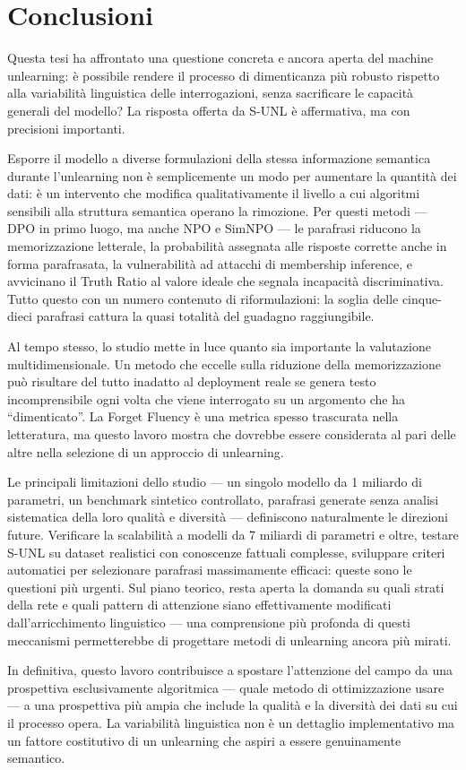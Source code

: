 \documentclass[12pt,a4paper]{article}
\begin{document}
\section{Conclusioni}

Questa tesi ha affrontato una questione concreta e ancora aperta del machine unlearning: è possibile rendere il processo di dimenticanza più robusto rispetto alla variabilità linguistica delle interrogazioni, senza sacrificare le capacità generali del modello? La risposta offerta da S-UNL è affermativa, ma con precisioni importanti.

Esporre il modello a diverse formulazioni della stessa informazione semantica durante l'unlearning non è semplicemente un modo per aumentare la quantità dei dati: è un intervento che modifica qualitativamente il livello a cui algoritmi sensibili alla struttura semantica operano la rimozione. Per questi metodi — DPO in primo luogo, ma anche NPO e SimNPO — le parafrasi riducono la memorizzazione letterale, la probabilità assegnata alle risposte corrette anche in forma parafrasata, la vulnerabilità ad attacchi di membership inference, e avvicinano il Truth Ratio al valore ideale che segnala incapacità discriminativa. Tutto questo con un numero contenuto di riformulazioni: la soglia delle cinque-dieci parafrasi cattura la quasi totalità del guadagno raggiungibile.

Al tempo stesso, lo studio mette in luce quanto sia importante la valutazione multidimensionale. Un metodo che eccelle sulla riduzione della memorizzazione può risultare del tutto inadatto al deployment reale se genera testo incomprensibile ogni volta che viene interrogato su un argomento che ha ``dimenticato''. La Forget Fluency è una metrica spesso trascurata nella letteratura, ma questo lavoro mostra che dovrebbe essere considerata al pari delle altre nella selezione di un approccio di unlearning.

Le principali limitazioni dello studio — un singolo modello da 1 miliardo di parametri, un benchmark sintetico controllato, parafrasi generate senza analisi sistematica della loro qualità e diversità — definiscono naturalmente le direzioni future. Verificare la scalabilità a modelli da 7 miliardi di parametri e oltre, testare S-UNL su dataset realistici con conoscenze fattuali complesse, sviluppare criteri automatici per selezionare parafrasi massimamente efficaci: queste sono le questioni più urgenti. Sul piano teorico, resta aperta la domanda su quali strati della rete e quali pattern di attenzione siano effettivamente modificati dall'arricchimento linguistico — una comprensione più profonda di questi meccanismi permetterebbe di progettare metodi di unlearning ancora più mirati.

In definitiva, questo lavoro contribuisce a spostare l'attenzione del campo da una prospettiva esclusivamente algoritmica — quale metodo di ottimizzazione usare — a una prospettiva più ampia che include la qualità e la diversità dei dati su cui il processo opera. La variabilità linguistica non è un dettaglio implementativo ma un fattore costitutivo di un unlearning che aspiri a essere genuinamente semantico.
\end{document}
